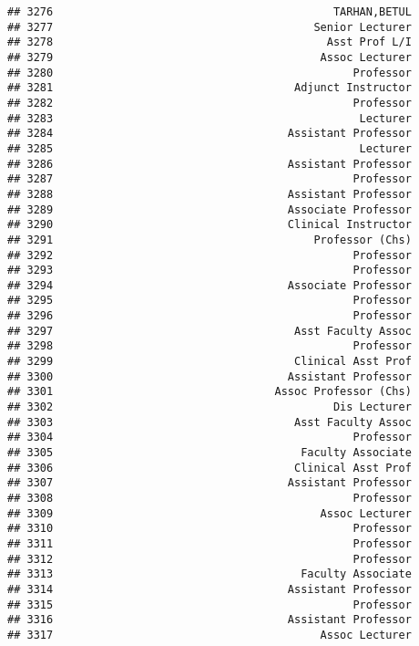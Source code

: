 \documentclass[
]{article}
\begin{document}
\begin{verbatim}
## 3276                                           TARHAN,BETUL
## 3277                                        Senior Lecturer
## 3278                                          Asst Prof L/I
## 3279                                         Assoc Lecturer
## 3280                                              Professor
## 3281                                     Adjunct Instructor
## 3282                                              Professor
## 3283                                               Lecturer
## 3284                                    Assistant Professor
## 3285                                               Lecturer
## 3286                                    Assistant Professor
## 3287                                              Professor
## 3288                                    Assistant Professor
## 3289                                    Associate Professor
## 3290                                    Clinical Instructor
## 3291                                        Professor (Chs)
## 3292                                              Professor
## 3293                                              Professor
## 3294                                    Associate Professor
## 3295                                              Professor
## 3296                                              Professor
## 3297                                     Asst Faculty Assoc
## 3298                                              Professor
## 3299                                     Clinical Asst Prof
## 3300                                    Assistant Professor
## 3301                                  Assoc Professor (Chs)
## 3302                                           Dis Lecturer
## 3303                                     Asst Faculty Assoc
## 3304                                              Professor
## 3305                                      Faculty Associate
## 3306                                     Clinical Asst Prof
## 3307                                    Assistant Professor
## 3308                                              Professor
## 3309                                         Assoc Lecturer
## 3310                                              Professor
## 3311                                              Professor
## 3312                                              Professor
## 3313                                      Faculty Associate
## 3314                                    Assistant Professor
## 3315                                              Professor
## 3316                                    Assistant Professor
## 3317                                         Assoc Lecturer

\end{verbatim}
\end{document}
